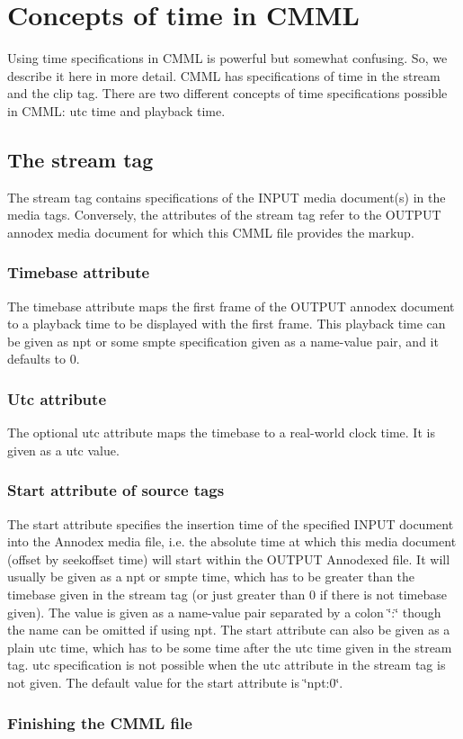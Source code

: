 \section{Concepts of time in CMML}
\label{group__time}
Using time specifications in CMML is powerful but somewhat confusing. So, we describe it here in more detail. CMML has specifications of time in the stream and the clip tag. There are two different concepts of time specifications possible in CMML: utc time and playback time.\subsection{The stream tag}\label{stream}
The stream tag contains specifications of the INPUT media document(s) in the media tags. Conversely, the attributes of the stream tag refer to the OUTPUT annodex media document for which this CMML file provides the markup.\subsubsection{Timebase attribute}\label{tb}
The timebase attribute maps the first frame of the OUTPUT annodex document to a playback time to be displayed with the first frame. This playback time can be given as npt or some smpte specification given as a name-value pair, and it defaults to 0.\subsubsection{Utc attribute}\label{utc}
The optional utc attribute maps the timebase to a real-world clock time. It is given as a utc value.\subsubsection{Start attribute of source tags}\label{start}
The start attribute specifies the insertion time of the specified INPUT document into the Annodex media file, i.e. the absolute time at which this media document (offset by seekoffset time) will start within the OUTPUT Annodexed file. It will usually be given as a npt or smpte time, which has to be greater than the timebase given in the stream tag (or just greater than 0 if there is not timebase given). The value is given as a name-value pair separated by a colon \char`\"{}:\char`\"{} though the name can be omitted if using npt. The start attribute can also be given as a plain utc time, which has to be some time after the utc time given in the stream tag. utc specification is not possible when the utc attribute in the stream tag is not given. The default value for the start attribute is \char`\"{}npt:0\char`\"{}.\subsubsection{Finishing the CMML file}\label{end}
